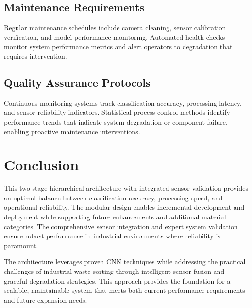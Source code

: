 \documentclass[11pt, a4paper]{article}
\begin{document}
\subsection{Maintenance Requirements}
Regular maintenance schedules include camera cleaning, sensor calibration verification, and model performance monitoring. Automated health checks monitor system performance metrics and alert operators to degradation that requires intervention.

\subsection{Quality Assurance Protocols}
Continuous monitoring systems track classification accuracy, processing latency, and sensor reliability indicators. Statistical process control methods identify performance trends that indicate system degradation or component failure, enabling proactive maintenance interventions.

\section{Conclusion}

This two-stage hierarchical architecture with integrated sensor validation provides an optimal balance between classification accuracy, processing speed, and operational reliability. The modular design enables incremental development and deployment while supporting future enhancements and additional material categories. The comprehensive sensor integration and expert system validation ensure robust performance in industrial environments where reliability is paramount.

The architecture leverages proven CNN techniques while addressing the practical challenges of industrial waste sorting through intelligent sensor fusion and graceful degradation strategies. This approach provides the foundation for a scalable, maintainable system that meets both current performance requirements and future expansion needs.
\end{document}
